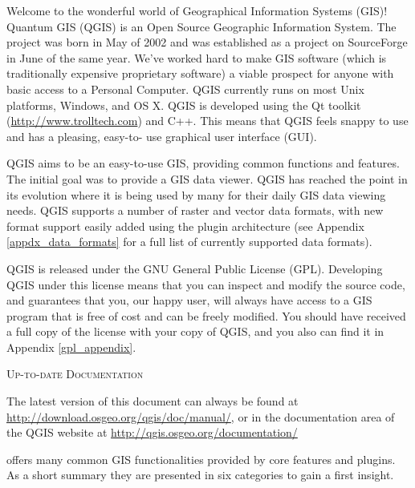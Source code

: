 \mainmatter
\pagestyle{scrheadings}
\label{label_forward}



Welcome to the wonderful world of Geographical Information Systems (GIS)!
Quantum GIS (QGIS) is an Open Source Geographic Information System. The project
was born in May of 2002 and was established as a project on SourceForge in June
of the same year. We've worked hard to make GIS software (which is traditionally
expensive proprietary software) a viable prospect for anyone with basic access
to a Personal Computer. QGIS currently runs on most Unix platforms, Windows, and
OS X. QGIS is developed using the Qt toolkit (\url{http://www.trolltech.com})
and C++. This means that QGIS feels snappy to use and has a pleasing, easy-to-
use graphical user interface (GUI). 

QGIS aims to be an easy-to-use GIS, providing common functions and features.
The initial goal was to provide a GIS data viewer. QGIS has reached the point
in its evolution where it is being used by many for their daily GIS data viewing
needs. QGIS supports a number of raster and vector data formats, with new
format support easily added using the plugin architecture (see Appendix
\ref{appdx_data_formats} for a full list of currently supported data formats).

QGIS is released under the GNU General Public License (GPL). Developing QGIS 
under this license means that you can inspect and modify the source code,
and guarantees that you, our happy user, will always have access to a GIS
program that is free of cost and can be freely modified. You should have
received a full copy of the license with your copy of QGIS, and you also can
find it in Appendix \ref{gpl_appendix}.  

\begin{Tip}\caption{\textsc{Up-to-date Documentation}}
The latest version of this document can always be found at 
\url{http://download.osgeo.org/qgis/doc/manual/}, or in the documentation
area of the QGIS website at \url{http://qgis.osgeo.org/documentation/}
\end{Tip}

\label{label_majfeat}

\qg offers many common GIS functionalities provided by core features and
plugins. As a short summary they are presented in six categories to gain a
first insight.

